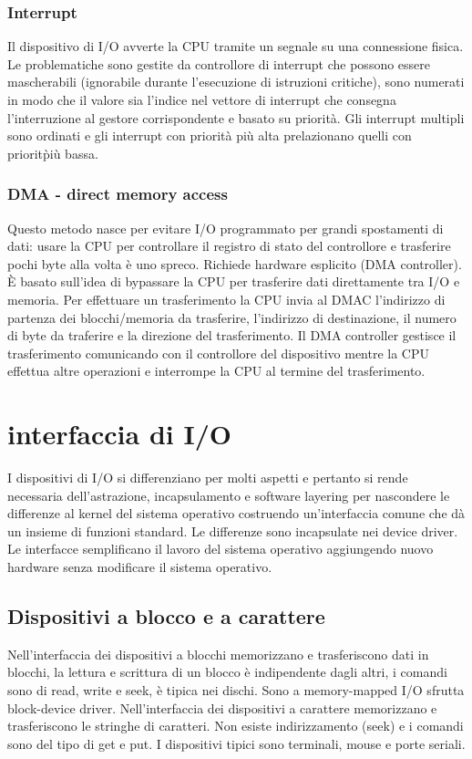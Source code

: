 \subsubsection{Interrupt}
Il dispositivo di I/O avverte la CPU tramite un segnale su una connessione fisica. Le problematiche sono gestite da controllore di interrupt che possono essere mascherabili (ignorabile
durante l'esecuzione di istruzioni critiche), sono numerati in modo che il valore sia l'indice nel vettore di interrupt che consegna l'interruzione al gestore corrispondente e basato su
priorit\`a. Gli interrupt multipli sono ordinati e gli interrupt con priorit\`a pi\`u alta prelazionano quelli con priorit\` pi\`u bassa. 
\subsubsection{DMA - direct memory access}
Questo metodo nasce per evitare I/O programmato per grandi spostamenti di dati: usare la CPU per controllare il registro di stato del controllore e trasferire pochi byte alla volta \`e 
uno spreco. Richiede hardware esplicito (DMA controller). \`E basato sull'idea di bypassare la CPU per trasferire dati direttamente tra I/O e memoria. Per effettuare un trasferimento
la CPU invia al DMAC l'indirizzo di partenza dei blocchi/memoria da trasferire, l'indirizzo di destinazione, il numero di byte da traferire e la direzione del trasferimento. Il DMA
controller gestisce il trasferimento comunicando con il controllore del dispositivo mentre la CPU effettua altre operazioni e interrompe la CPU al termine del trasferimento. 
\section{interfaccia di I/O}
I dispositivi di I/O si differenziano per molti aspetti e pertanto si rende necessaria dell'astrazione, incapsulamento e software layering per nascondere le differenze al kernel del 
sistema operativo costruendo un'interfaccia comune che d\`a un insieme di funzioni standard. Le differenze sono incapsulate nei device driver. Le interfacce semplificano il lavoro del
sistema operativo aggiungendo nuovo hardware senza modificare il sistema operativo. 
\subsection{Dispositivi a blocco e a carattere}
Nell'interfaccia dei dispositivi a blocchi memorizzano e trasferiscono dati in blocchi, la lettura e scrittura di un blocco \`e indipendente dagli altri, i comandi sono di 
read, write e seek, \`e tipica nei dischi. Sono a memory-mapped I/O sfrutta block-device driver. Nell'interfaccia dei dispositivi a carattere memorizzano e trasferiscono le stringhe di
caratteri. Non esiste indirizzamento (seek) e i comandi sono del tipo di get e put. I dispositivi tipici sono terminali, mouse e porte seriali. 
